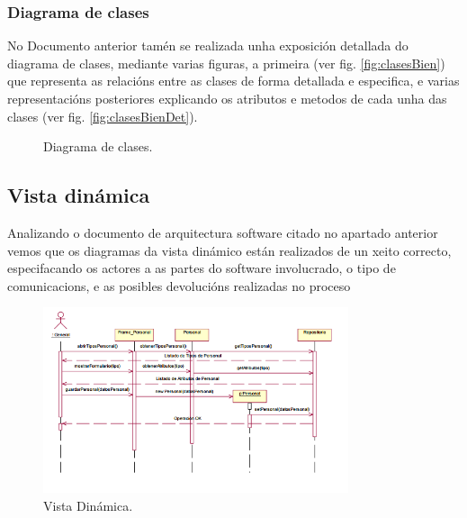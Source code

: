 \documentclass[DIV=calc,paper=a4,fontsize=11pt,onecolumn]{scrartcl}	 %
\begin{document}
\newpage
\subsubsection{Diagrama de clases}
No Documento anterior \cite{ENAHP} tamén se realizada unha exposición detallada do diagrama de clases, mediante varias figuras, a primeira (ver fig. \ref{fig:clasesBien}) que representa as relacións entre as clases de forma detallada e especifica, e varias representacións posteriores explicando os atributos e metodos de cada unha das clases (ver fig. \ref{fig:clasesBienDet}).

\begin{figure}[h]
\centering
{}
\caption{Diagrama de clases.}
\label{fig:clasesBienTot}
\end{figure}

\newpage
\subsection{Vista dinámica}
Analizando o documento de arquitectura software citado no apartado anterior \cite{ENAHP} vemos que os diagramas da vista dinámico están realizados de un xeito correcto, especifacando os actores a as partes do software involucrado, o tipo de comunicacions, e as posibles devolucións realizadas no proceso

\begin{figure}[h]
\centering
\includegraphics[width=0.8\textwidth]{./figuras/dinamicaBien.png}
\caption{Vista Dinámica.}
\label{fig:dinBien}
\end{figure}
\newpage
\end{document}
